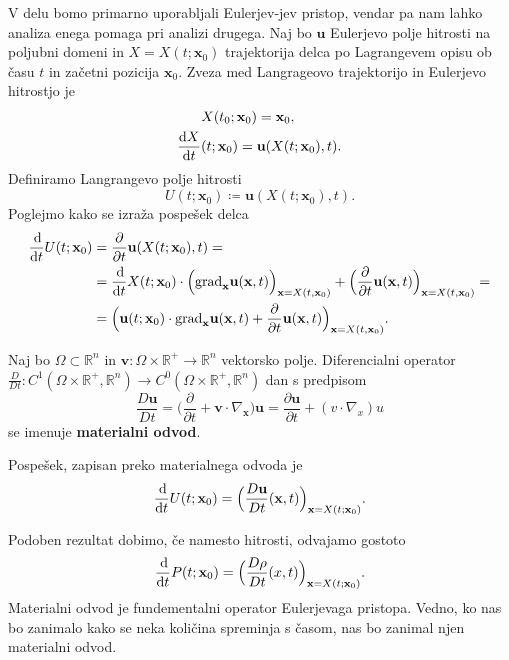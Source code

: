 \documentclass[mat2, tisk]{fmfdelo}
\newcommand{\R}{\mathbb R}
\newcommand{\bd}{\textbf}
\begin{document}
V delu bomo primarno uporabljali Eulerjev-jev pristop, vendar pa nam lahko analiza enega pomaga
pri analizi drugega. Naj bo $\bd{u}$ Eulerjevo polje hitrosti na poljubni domeni in $X = X(t; \bd{x}_0)$ trajektorija delca 
po Lagrangevem opisu ob času $t$ in začetni pozicija $\bd{x}_0$. 
Zveza med Langrageovo trajektorijo in Eulerjevo hitrostjo je 
\begin{align}
&X(t_0; \bd{x}_0) = \bd{x}_0, \\
\frac{\dif X}{\dif t}&(t; \bd{x}_0) = \bd{u}(X(t; \bd{x}_0), t).
\end{align}
Definiramo Langrangevo polje hitrosti
\begin{equation}
U(t; \bd{x}_0) \coloneqq \bd{u}(X(t; \bd{x}_0), t).
\end{equation}
Poglejmo kako se izraža pospešek delca
\begin{align*}
\frac{\dif}{\dif t} U(t; \bd{x}_0) &= \frac{\partial}{\partial t} \bd{u}(X(t; \bd{x}_0), t) = \\
&= \frac{\dif}{\dif t} X(t; \bd{x}_0) \cdot \Big(\text{grad}_\bd{x} \bd{u}(\bd{x}, t) \Big)_{\bd{x} = X(t, \bd{x}_0)} + \Big(\frac{\partial}{\partial t} \bd{u}(\bd{x}, t) \Big)_{\bd{x} = X(t, \bd{x}_0)} = \\
&= \Big(\bd{u}(t; \bd{x}_0) \cdot \text{grad}_\bd{x} \bd{u}(\bd{x}, t) + \frac{\partial}{\partial t} \bd{u}(\bd{x}, t) \Big)_{\bd{x} = X(t, \bd{x}_0)}.
\end{align*}

\newpage
\begin{definicija}
Naj bo $\Omega \subset \R^n$ in $\bd{v}: \Omega\times \R^+ \rightarrow \R^n$ vektorsko polje. Diferencialni operator 
$\frac{D}{D t}: C^1(\Omega \times \R^+, \R^n) \rightarrow C^0(\Omega \times \R^+, \R^n)$ dan s predpisom
\begin{equation}
\frac{D \bd{u}}{Dt} = \Big(\frac{\partial}{\partial t} + \bd{v} \cdot \nabla_\bd{x}\Big) \bd{u} = \frac{\partial \bd{u}}{\partial t} + (v\cdot \nabla_x) u
\end{equation}
se imenuje \textbf{materialni odvod}.
\end{definicija}

Pospešek, zapisan preko materialnega odvoda je 
\begin{equation}
\frac{\dif}{\dif t} U(t; \bd{x}_0) = \Big(\frac{D \bd{u}}{Dt}(\bd{x}, t) \Big)_{\bd{x} = X(t; \bd{x}_0)}.
\end{equation}

Podoben rezultat dobimo, če namesto hitrosti, odvajamo gostoto
\begin{equation}
\frac{\dif }{\dif t} P(t; \bd{x}_0) = \Big(\frac{D \rho}{Dt}(x, t) \Big)_{\bd{x} = X(t; \bd{x}_0)}.
\end{equation}
Materialni odvod je fundementalni operator Eulerjevaga pristopa. Vedno, ko nas bo 
zanimalo kako se neka količina spreminja s časom, nas bo zanimal njen materialni odvod.
\end{document}

